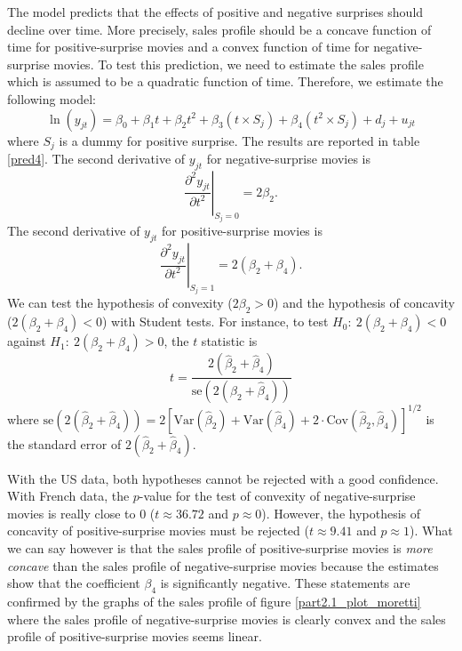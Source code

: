 The model predicts that the effects of positive and negative surprises should decline over time.
More precisely, sales profile should be a concave function of time for positive-surprise movies and a convex function of time for negative-surprise movies.
To test this prediction, we need to estimate the sales profile which is assumed to be a quadratic function of time.
Therefore, we estimate the following model:
\begin{equation*}
	\ln (y_{jt}) = \beta_0 + \beta_1 t + \beta_2 t^2 + \beta_3 (t \times S_j) + \beta_4 (t^2 \times S_j) + d_j + u_{jt}
\end{equation*}
where $S_j$ is a dummy for positive surprise.
The results are reported in table \ref{pred4}.
The second derivative of $y_{jt}$ for negative-surprise movies is 
\begin{equation*}
	\left.\frac{\partial^2 y_{jt}}{\partial t^2}\right|_{S_j=0} = 2 \beta_2.
\end{equation*}
The second derivative of $y_{jt}$ for positive-surprise movies is 
\begin{equation*}
	\left.\frac{\partial^2 y_{jt}}{\partial t^2}\right|_{S_j=1} = 2 (\beta_2 + \beta_4).
\end{equation*}
We can test the hypothesis of convexity ($2\beta_2 > 0$) and the hypothesis of concavity ($2(\beta_2 + \beta_4) < 0$) with Student tests.
For instance, to test $H_0:~2(\beta_2 + \beta_4) < 0$ against $H_1:~2(\beta_2 + \beta_4) > 0$, the $t$ statistic is
\begin{equation*}
	t = \frac{2(\hat{\beta}_2 + \hat{\beta}_4)}{\text{se}(2(\hat{\beta}_2 + \hat{\beta}_4))} 
\end{equation*}
where $\text{se}(2(\hat{\beta}_2 + \hat{\beta}_4)) = 2[\text{Var}(\hat{\beta}_2) + \text{Var}(\hat{\beta}_4) + 2\cdot \text{Cov}(\hat{\beta}_2, \hat{\beta}_4)]^{1/2}$ is the standard error of $2(\hat{\beta}_2 + \hat{\beta}_4)$.

With the US data, both hypotheses cannot be rejected with a good confidence.
With French data, the $p$-value for the test of convexity of negative-surprise movies is really close to 0 ($t \approx 36.72$ and $p \approx 0$). 
However, the hypothesis of concavity of positive-surprise movies must be rejected ($t \approx 9.41$ and $p \approx 1$).
What we can say however is that the sales profile of positive-surprise movies is \textit{more concave} than the sales profile of negative-surprise movies because the estimates show that the coefficient $\beta_4$ is significantly negative.
These statements are confirmed by the graphs of the sales profile of figure \ref{part2.1_plot_moretti} where the sales profile of negative-surprise movies is clearly convex and the sales profile of positive-surprise movies seems linear.

